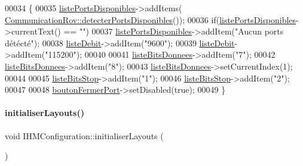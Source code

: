 \begin{DoxyCode}
00034 \{
00035     \hyperlink{class_i_h_m_configuration_af3ce74444e24237aedf1d2ef2053b574}{listePortsDisponibles}->addItems(
      \hyperlink{class_communication_rov_ad9882c08083c66cd89b472b9244727e9}{CommunicationRov::detecterPortsDisponibles}());
00036     \textcolor{keywordflow}{if}(\hyperlink{class_i_h_m_configuration_af3ce74444e24237aedf1d2ef2053b574}{listePortsDisponibles}->currentText() == \textcolor{stringliteral}{""})
00037         \hyperlink{class_i_h_m_configuration_af3ce74444e24237aedf1d2ef2053b574}{listePortsDisponibles}->addItem(\textcolor{stringliteral}{"Aucun ports détécté"});
00038     \hyperlink{class_i_h_m_configuration_a98e8133a04509b3a80b232d2f031e81f}{listeDebit}->addItem(\textcolor{stringliteral}{"9600"});
00039     \hyperlink{class_i_h_m_configuration_a98e8133a04509b3a80b232d2f031e81f}{listeDebit}->addItem(\textcolor{stringliteral}{"115200"});
00040 
00041     \hyperlink{class_i_h_m_configuration_a83c61d075d53758bd753aada9a0bb452}{listeBitsDonnees}->addItem(\textcolor{stringliteral}{"7"});
00042     \hyperlink{class_i_h_m_configuration_a83c61d075d53758bd753aada9a0bb452}{listeBitsDonnees}->addItem(\textcolor{stringliteral}{"8"});
00043     \hyperlink{class_i_h_m_configuration_a83c61d075d53758bd753aada9a0bb452}{listeBitsDonnees}->setCurrentIndex(1);
00044 
00045     \hyperlink{class_i_h_m_configuration_a16ae724388b797983c78e87e7d5485cb}{listeBitsStop}->addItem(\textcolor{stringliteral}{"1"});
00046     \hyperlink{class_i_h_m_configuration_a16ae724388b797983c78e87e7d5485cb}{listeBitsStop}->addItem(\textcolor{stringliteral}{"2"});
00047 
00048     \hyperlink{class_i_h_m_configuration_a25c0b3c51a8d162ae3439a56ec644909}{boutonFermerPort}->setDisabled(\textcolor{keyword}{true});
00049 \}
\end{DoxyCode}
\mbox{\label{class_i_h_m_configuration_ab76abe78fff3b7945b675acddbd320f0}} 
\paragraph{\texorpdfstring{initialiser\+Layouts()}{initialiserLayouts()}}
{\footnotesize\ttfamily void I\+H\+M\+Configuration\+::initialiser\+Layouts (\begin{DoxyParamCaption}{ }\end{DoxyParamCaption})\hspace{0.3cm}{\ttfamily [private]}}



